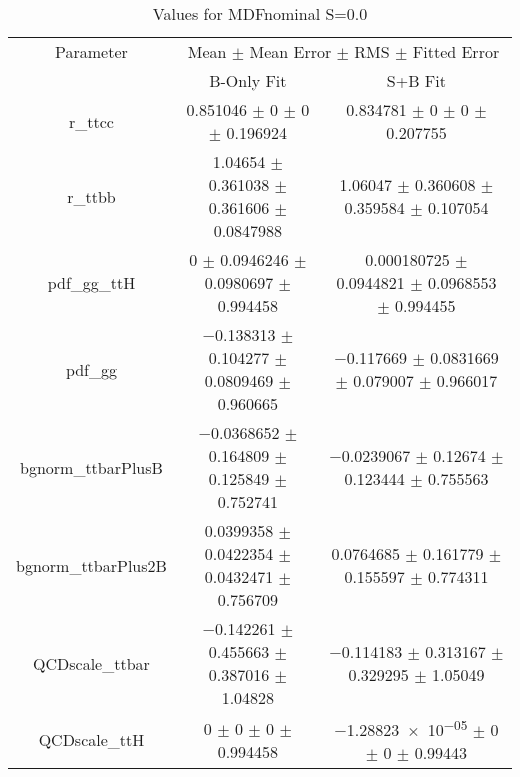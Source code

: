 \begin{table}
\centering
\caption{Values for MDFnominal S=0.0}
\begin{tabular}{ccc}
\toprule
Parameter & \multicolumn{2}{c}{Mean $\pm$ Mean Error $\pm$ RMS $\pm$ Fitted Error}\\
 & B-Only Fit & S+B Fit\\
\midrule
r\_ttcc & \num{0.851046} $\pm$ \num{0} $\pm$ \num{0} $\pm$ \num{0.196924} & \num{0.834781} $\pm$ \num{0} $\pm$ \num{0} $\pm$ \num{0.207755}\\
r\_ttbb & \num{1.04654} $\pm$ \num{0.361038} $\pm$ \num{0.361606} $\pm$ \num{0.0847988} & \num{1.06047} $\pm$ \num{0.360608} $\pm$ \num{0.359584} $\pm$ \num{0.107054}\\
pdf\_gg\_ttH & \num{0} $\pm$ \num{0.0946246} $\pm$ \num{0.0980697} $\pm$ \num{0.994458} & \num{0.000180725} $\pm$ \num{0.0944821} $\pm$ \num{0.0968553} $\pm$ \num{0.994455}\\
pdf\_gg & \num{-0.138313} $\pm$ \num{0.104277} $\pm$ \num{0.0809469} $\pm$ \num{0.960665} & \num{-0.117669} $\pm$ \num{0.0831669} $\pm$ \num{0.079007} $\pm$ \num{0.966017}\\
bgnorm\_ttbarPlusB & \num{-0.0368652} $\pm$ \num{0.164809} $\pm$ \num{0.125849} $\pm$ \num{0.752741} & \num{-0.0239067} $\pm$ \num{0.12674} $\pm$ \num{0.123444} $\pm$ \num{0.755563}\\
bgnorm\_ttbarPlus2B & \num{0.0399358} $\pm$ \num{0.0422354} $\pm$ \num{0.0432471} $\pm$ \num{0.756709} & \num{0.0764685} $\pm$ \num{0.161779} $\pm$ \num{0.155597} $\pm$ \num{0.774311}\\
QCDscale\_ttbar & \num{-0.142261} $\pm$ \num{0.455663} $\pm$ \num{0.387016} $\pm$ \num{1.04828} & \num{-0.114183} $\pm$ \num{0.313167} $\pm$ \num{0.329295} $\pm$ \num{1.05049}\\
QCDscale\_ttH & \num{0} $\pm$ \num{0} $\pm$ \num{0} $\pm$ \num{0.994458} & \num{-1.28823e-05} $\pm$ \num{0} $\pm$ \num{0} $\pm$ \num{0.99443}\\
\bottomrule
\end{tabular}
\end{table}